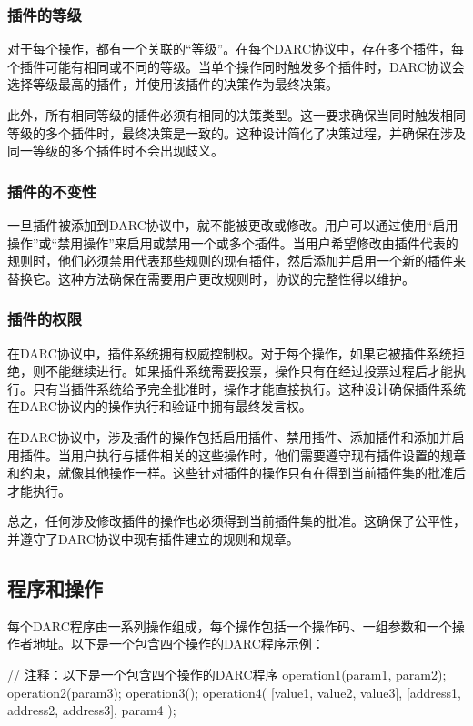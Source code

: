 \documentclass[main.tex]{subfiles}
\begin{document}
\subsubsection{插件的等级}

对于每个操作，都有一个关联的“等级”。在每个DARC协议中，存在多个插件，每个插件可能有相同或不同的等级。当单个操作同时触发多个插件时，DARC协议会选择等级最高的插件，并使用该插件的决策作为最终决策。

此外，所有相同等级的插件必须有相同的决策类型。这一要求确保当同时触发相同等级的多个插件时，最终决策是一致的。这种设计简化了决策过程，并确保在涉及同一等级的多个插件时不会出现歧义。

\subsubsection{插件的不变性}

一旦插件被添加到DARC协议中，就不能被更改或修改。用户可以通过使用“启用操作”或“禁用操作”来启用或禁用一个或多个插件。当用户希望修改由插件代表的规则时，他们必须禁用代表那些规则的现有插件，然后添加并启用一个新的插件来替换它。这种方法确保在需要用户更改规则时，协议的完整性得以维护。

\subsubsection{插件的权限}

在DARC协议中，插件系统拥有权威控制权。对于每个操作，如果它被插件系统拒绝，则不能继续进行。如果插件系统需要投票，操作只有在经过投票过程后才能执行。只有当插件系统给予完全批准时，操作才能直接执行。这种设计确保插件系统在DARC协议内的操作执行和验证中拥有最终发言权。

在DARC协议中，涉及插件的操作包括启用插件、禁用插件、添加插件和添加并启用插件。当用户执行与插件相关的这些操作时，他们需要遵守现有插件设置的规章和约束，就像其他操作一样。这些针对插件的操作只有在得到当前插件集的批准后才能执行。

总之，任何涉及修改插件的操作也必须得到当前插件集的批准。这确保了公平性，并遵守了DARC协议中现有插件建立的规则和规章。

\subsection{程序和操作}

每个DARC程序由一系列操作组成，每个操作包括一个操作码、一组参数和一个操作者地址。以下是一个包含四个操作的DARC程序示例：

\begin{spverbatim}

// 注释：以下是一个包含四个操作的DARC程序
operation1(param1, param2);
operation2(param3);
operation3();
operation4(
    [value1, value2, value3], 
    [address1, address2, address3],
    param4
);

\end{spverbatim}
\end{document}
